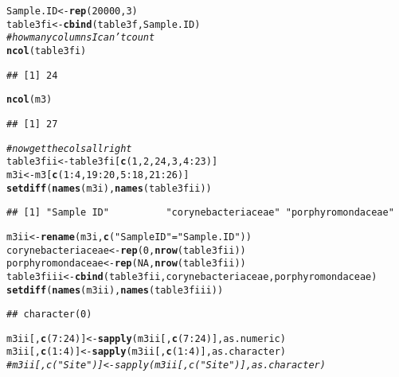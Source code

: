 \documentclass{article}\usepackage[]{graphicx}\usepackage[]{color}
\makeatletter
\newcommand{\hlnum}[1]{\textcolor[rgb]{0.686,0.059,0.569}{#1}}%
\newcommand{\hlstr}[1]{\textcolor[rgb]{0.192,0.494,0.8}{#1}}%
\newcommand{\hlcom}[1]{\textcolor[rgb]{0.678,0.584,0.686}{\textit{#1}}}%
\newcommand{\hlopt}[1]{\textcolor[rgb]{0,0,0}{#1}}%
\newcommand{\hlstd}[1]{\textcolor[rgb]{0.345,0.345,0.345}{#1}}%
\newcommand{\hlkwb}[1]{\textcolor[rgb]{0.69,0.353,0.396}{#1}}%
\newcommand{\hlkwd}[1]{\textcolor[rgb]{0.737,0.353,0.396}{\textbf{#1}}}%
\newenvironment{kframe}{%
 \def\at@end@of@kframe{}%
 \ifinner\ifhmode%
  \def\at@end@of@kframe{\end{minipage}}%
  \begin{minipage}{\columnwidth}%
 \fi\fi%
 \def\FrameCommand##1{\hskip\@totalleftmargin \hskip-\fboxsep
 \colorbox{shadecolor}{##1}\hskip-\fboxsep
     \hskip-\linewidth \hskip-\@totalleftmargin \hskip\columnwidth}%
 \MakeFramed {\advance\hsize-\width
   \@totalleftmargin\z@ \linewidth\hsize
   \@setminipage}}%
 {\par\unskip\endMakeFramed%
 \at@end@of@kframe}
\newenvironment{knitrout}{}{} %
\makeatother
\begin{document}
\begin{frame}[fragile]
\begin{knitrout}
\begin{kframe}
{\ttfamily\noindent\itshape\color{messagecolor}{\#\# Loading required package: plyr}}\begin{alltt}
\hlstd{Sample.ID}\hlkwb{<-}\hlkwd{rep}\hlstd{(}\hlnum{20000}\hlstd{,}\hlnum{3}\hlstd{)}
\hlstd{table3fi}\hlkwb{<-}\hlkwd{cbind}\hlstd{(table3f,Sample.ID)}
\hlcom{#how many columns I can't count}
\hlkwd{ncol}\hlstd{(table3fi)}
\end{alltt}
\begin{verbatim}
## [1] 24
\end{verbatim}
\begin{alltt}
\hlkwd{ncol}\hlstd{(m3)}
\end{alltt}
\begin{verbatim}
## [1] 27
\end{verbatim}
\begin{alltt}
\hlcom{#now get the cols all right}
\hlstd{table3fii}\hlkwb{<-}\hlstd{table3fi[}\hlkwd{c}\hlstd{(}\hlnum{1}\hlstd{,}\hlnum{2}\hlstd{,}\hlnum{24}\hlstd{,}\hlnum{3}\hlstd{,}\hlnum{4}\hlopt{:}\hlnum{23}\hlstd{)]}
\hlstd{m3i}\hlkwb{<-}\hlstd{m3[}\hlkwd{c}\hlstd{(}\hlnum{1}\hlopt{:}\hlnum{4}\hlstd{,}\hlnum{19}\hlopt{:}\hlnum{20}\hlstd{,}\hlnum{5}\hlopt{:}\hlnum{18}\hlstd{,}\hlnum{21}\hlopt{:}\hlnum{26}\hlstd{)]}
\hlkwd{setdiff}\hlstd{(}\hlkwd{names}\hlstd{(m3i),}\hlkwd{names}\hlstd{(table3fii))}
\end{alltt}
\begin{verbatim}
## [1] "Sample ID"          "corynebacteriaceae" "porphyromondaceae"
\end{verbatim}
\begin{alltt}
\hlstd{m3ii}\hlkwb{<-}\hlkwd{rename}\hlstd{(m3i,}\hlkwd{c}\hlstd{(}\hlstr{"Sample ID"}\hlstd{=}\hlstr{"Sample.ID"}\hlstd{))}
\hlstd{corynebacteriaceae}\hlkwb{<-}\hlkwd{rep}\hlstd{(}\hlnum{0}\hlstd{,}\hlkwd{nrow}\hlstd{(table3fii))}
\hlstd{porphyromondaceae}\hlkwb{<-}\hlkwd{rep}\hlstd{(}\hlnum{NA}\hlstd{,}\hlkwd{nrow}\hlstd{(table3fii))}
\hlstd{table3fiii}\hlkwb{<-}\hlkwd{cbind}\hlstd{(table3fii, corynebacteriaceae, porphyromondaceae)}
\hlkwd{setdiff}\hlstd{(}\hlkwd{names}\hlstd{(m3ii),}\hlkwd{names}\hlstd{(table3fiii))}
\end{alltt}
\begin{verbatim}
## character(0)
\end{verbatim}
\begin{alltt}
\hlstd{m3ii[,}\hlkwd{c}\hlstd{(}\hlnum{7}\hlopt{:}\hlnum{24}\hlstd{)]} \hlkwb{<-} \hlkwd{sapply}\hlstd{(m3ii[,}\hlkwd{c}\hlstd{(}\hlnum{7}\hlopt{:}\hlnum{24}\hlstd{)],as.numeric)}
\hlstd{m3ii[,}\hlkwd{c}\hlstd{(}\hlnum{1}\hlopt{:}\hlnum{4}\hlstd{)]} \hlkwb{<-}\hlkwd{sapply}\hlstd{(m3ii[,}\hlkwd{c}\hlstd{(}\hlnum{1}\hlopt{:}\hlnum{4}\hlstd{)],as.character)}
\hlcom{#m3ii[,c("Site")] <-sapply(m3ii[,c("Site")],as.character)}


\end{alltt}
\end{kframe}
\end{knitrout}
\end{frame}
\end{document}
